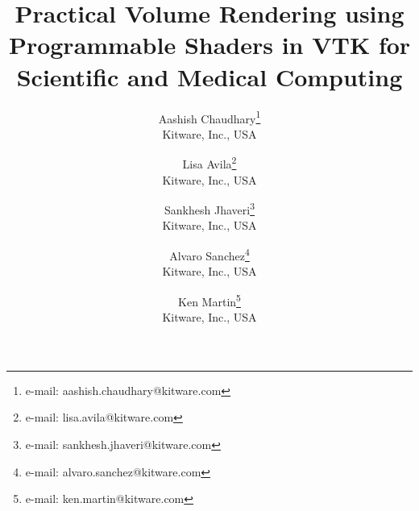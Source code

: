 \title{Practical Volume Rendering using Programmable Shaders in VTK for Scientific and Medical Computing}

\author{Aashish Chaudhary\thanks{e-mail: aashish.chaudhary@kitware.com}\\ %
        \scriptsize Kitware, Inc., USA%
\and Lisa Avila\thanks{e-mail: lisa.avila@kitware.com}\\ %
        \scriptsize Kitware, Inc., USA %
\and Sankhesh Jhaveri\thanks{e-mail: sankhesh.jhaveri@kitware.com}\\ %
        \scriptsize Kitware, Inc., USA %
\and Alvaro Sanchez\thanks{e-mail: alvaro.sanchez@kitware.com}\\ %
        \scriptsize Kitware, Inc., USA %
\and Ken Martin\thanks{e-mail: ken.martin@kitware.com}\\ %
        \scriptsize Kitware, Inc., USA %
}